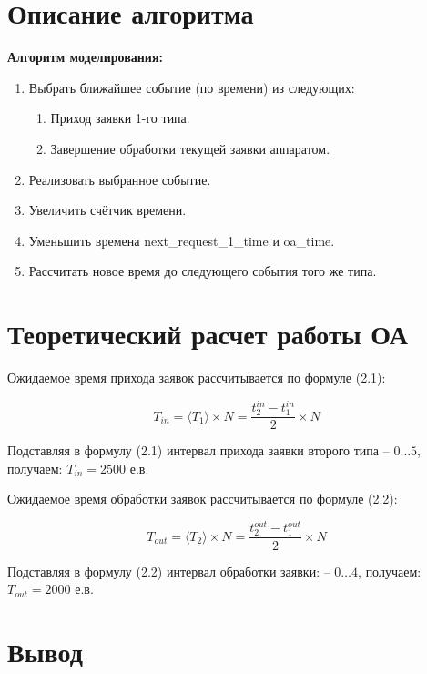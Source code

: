 \section{Описание алгоритма}

\textbf{Алгоритм моделирования:}

\begin{enumerate}
	\item Выбрать ближайшее событие (по времени) из следующих:
	\begin{enumerate}
		\item Приход заявки 1-го типа.
		\item Завершение обработки текущей заявки аппаратом.
	\end{enumerate}
	\item Реализовать выбранное событие.
	\item Увеличить счётчик времени.
	\item Уменьшить времена next\_request\_1\_time и oa\_time.
	\item Рассчитать новое время до следующего события того же типа.
\end{enumerate}

\clearpage

\section{Теоретический расчет работы ОА}

Ожидаемое время прихода заявок рассчитывается по формуле (2.1):

\begin{equation}
T_{in} = \langle T_1 \rangle \times N = \frac{t_2^{in} - t_1^{in}}{2} \times N
\end{equation}

Подставляя в формулу (2.1) интервал прихода заявки второго типа -- $0\dots5$, получаем: $T_{in} = 2500$ е.в.

Ожидаемое время обработки заявок рассчитывается по формуле (2.2):

\begin{equation}
T_{out} = \langle T_2 \rangle \times N = \frac{t_2^{out} - t_1^{out}}{2} \times N
\end{equation}

Подставляя в формулу (2.2) интервал обработки заявки: -- $0\dots4$, получаем: $T_{out} = 2000$ е.в.

\section{Вывод}

